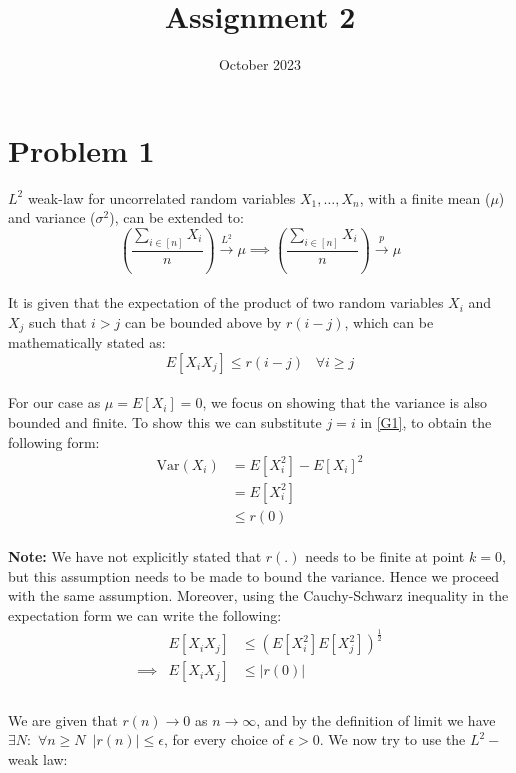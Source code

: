 \documentclass{article}
\title{Assignment 2}
\date{October 2023}
\newcommand{\indexset}[1]{[#1]}
\newcommand{\bracket}[1]{\left(#1\right)}
\begin{document}
\section{Problem 1}
$L^2$ weak-law for uncorrelated random variables $X_1, \dots, X_n$, with a finite mean ($\mu$) and variance ($\sigma^2$), can be extended to:
\begin{equation}
    \label{G0}
    \bracket{\frac{\sum_{i \in \indexset{n}} X_i}{n}} \xrightarrow{L^2} \mu  \implies \bracket{\frac{\sum_{i \in \indexset{n}} X_i}{n}} \xrightarrow{p} \mu
\end{equation}
\\
It is given that the expectation of the product of two random variables $X_i$ and $X_j$ such that $i > j$ can be bounded above by $r(i-j)$, which can be mathematically stated as: 
\begin{equation}
    \label{G1}
    E[X_i X_j] \leq r(i-j) \, \, \, \, \, \forall i \geq  j 
\end{equation}
\\
For our case as $\mu = E[X_i] = 0$, we focus on showing that the variance is also bounded and finite. To show this we can substitute $j = i$ in \ref{G1}, to obtain the following form: 
\begin{equation}
    \begin{array}{rl}
         \text{Var}(X_i) &= E[X_i^2] - E[X_i]^2 \\
                         &= E[X_i^2]\\
                         &\leq r(0)
    \end{array}   
\end{equation}\\
\textbf{Note:} We have not explicitly stated that $r(.)$ needs to be finite at point $k=0$, but this assumption needs to be made to bound the variance. Hence we proceed with the same assumption. Moreover, using the Cauchy-Schwarz inequality in the expectation form we can write the following: 
\begin{equation}
    \label{G3}
    \begin{array}{rrl}
        & E[X_i X_j] &\leq \bracket{E[X_i^2] E[X_j^2]}^{\frac{1}{2}} \\ 
        \implies& E[X_i X_j] &\leq \vert r(0) \vert\\
    \end{array}
\end{equation}\\
We are given that $r(n) \rightarrow 0$ as $n \rightarrow \infty$, and by the definition of limit we have $\exists N : \, \, \forall n \geq N \,\,\,  \vert r(n)\vert \leq \epsilon $, for every choice of $\epsilon > 0$. We now try to use the $L^2-$weak law:
\end{document}

